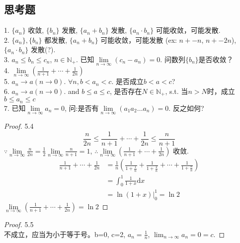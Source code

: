 \subsection{思考题}
	1. $ \{a_n\} $ 收敛, $ \{b_n\} $ 发散, $ \{a_n+b_n\} $ 发散,  $ \{a_n\cdot b_n\} $ 可能收敛，可能发散.\\
	2. $ \{a_n\}, \{b_n\} $ 都发散, $ \{a_n+b_n\} $ 可能收敛，可能发散 (ex: $ n+-n $,   $n+-2n $),  $ \{a_n\cdot b_n\} $ 发散(?).\\
	3. $ a_n\leqslant b_n \leqslant c_n $, $ n\in\mathbb{N}_+ $. 已知$ \lim\limits_{n\rightarrow\infty}(c_n-a_n)=0 $. 问数列$ \{b_n\} $是否收敛？\\
	4. $ \lim\limits_{n\rightarrow\infty}(\frac{1}{n+1} + \cdots + \frac{1}{2n}) $\\
	5. $ a_n\rightarrow a(n\rightarrow 0) $. $ \forall n, b<a_n<c $. 是否成立$ b<a<c $?\\
	6. $ a_n \rightarrow a(n\rightarrow 0) $. and $ b\leqslant a\leqslant c  $, 是否存在$ N\in\mathbb{N}_+ $, s.t. 当$ n>N $时，成立$ b\leqslant a_n \leqslant c$\\
	7. 已知$ \lim\limits_{n\rightarrow\infty}a_n = 0 $, 问:是否有$ \lim\limits_{n\rightarrow\infty} (a_1a_2\dots a_n) = 0 $. 反之如何?
\begin{proof}5.4\\
	\begin{equation*}
		 \frac{n}{2n} \leqslant \frac{1}{n+1} + \cdots + \frac{1}{2n}  \leqslant \frac{n}{n+1}
	\end{equation*}
	$ \because 
	\lim\limits_{n\rightarrow\infty} 
	\frac{n}{2n} = \frac{1}{2}
	\lim\limits_{n\rightarrow\infty} 
	\frac{n}{n+1} = 1
	$, $ \therefore \lim\limits_{n\rightarrow\infty}(\frac{1}{n+1} + \cdots + \frac{1}{2n} ) $ 收敛.
	\begin{align*}
		\frac{1}{n+1} + \cdots + \frac{1}{2n}
		&= \frac{1}{n}(\frac{1}{1+\frac{1}{n}} + \frac{1}{1+\frac{2}{n}} + \cdots + \frac{1}{1+\frac{n}{n}})\\
		&= \int_{0}^{1}\frac{1}{1+x}\text{d}x\\
		&= \ln(1+x)|_0^1 = \ln{2}
	\end{align*}
	$ \lim\limits_{n\rightarrow\infty}(\frac{1}{n+1} + \cdots + \frac{1}{2n})=\ln{2}  $	
\end{proof}
\begin{proof}5.5\\
	不成立，应当为小于等于号。b=0, c=2, $ a_n = \frac{1}{n} $, $ \lim_{n\rightarrow\infty}a_n = 0 = c $.
\end{proof}
